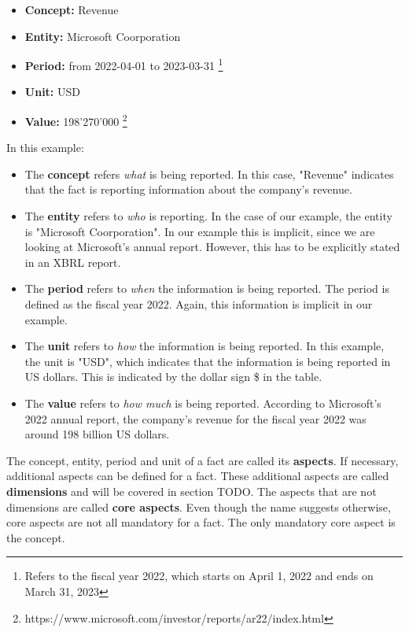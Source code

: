 \begin{itemize}
    \item \textbf{Concept:} Revenue
    \item \textbf{Entity:} Microsoft Coorporation
    \item \textbf{Period:} from 2022-04-01 to 2023-03-31 \footnote[0]{Refers to the fiscal year 2022, which starts on April 1, 2022 and ends on March 31, 2023}
    \item \textbf{Unit:} USD
    \item \textbf{Value:} 198'270'000 \footnote[1]{https://www.microsoft.com/investor/reports/ar22/index.html}
\end{itemize}

In this example:

\begin{itemize}
    \item The \textbf{concept} refers \textit{what} is being reported. 
    In this case, "Revenue" indicates that the fact is reporting information about the company's revenue.
    \item The \textbf{entity} refers to \textit{who} is reporting. 
    In the case of our example, the entity is "Microsoft Coorporation". 
    In our example this is implicit, since we are looking at Microsoft's annual report.
    However, this has to be explicitly stated in an XBRL report.
    \item The \textbf{period} refers to \textit{when} the information is being reported.
    The period is defined as the fiscal year 2022.
    Again, this information is implicit in our example.
    \item The \textbf{unit} refers to \textit{how} the information is being reported.
    In this example, the unit is "USD", which indicates that the information is being reported in US dollars.
    This is indicated by the dollar sign \$ in the table.
    \item The \textbf{value} refers to \textit{how much} is being reported.
    According to Microsoft's 2022 annual report, the company's revenue for the fiscal year 2022 was around 198 billion US dollars.
\end{itemize}

The concept, entity, period and unit of a fact are called its \textbf{aspects}. 
If necessary, additional aspects can be defined for a fact. 
These additional aspects are called \textbf{dimensions} and will be covered in section TODO.
The aspects that are not dimensions are called \textbf{core aspects}. 
Even though the name suggests otherwise, core aspects are not all mandatory for a fact.
The only mandatory core aspect is the concept.